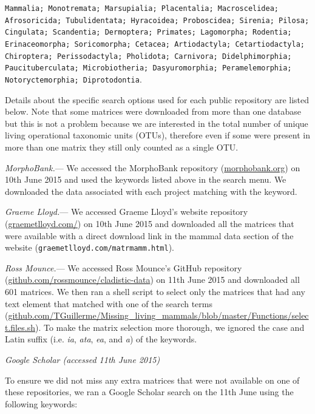 \documentclass[12pt,letterpaper]{article}
\renewcommand{\subsection}[1]{%
\bigskip
\begin{center}
\begin{large}
\normalfont\itshape #1
\end{large}
\end{center}}
\renewcommand{\subsubsection}[1]{%
\vspace{2ex}
\noindent
\textit{#1.}---}
\begin{document}
\texttt{Mammalia; Monotremata; Marsupialia; Placentalia; Macroscelidea; Afrosoricida; Tubulidentata; Hyracoidea; Proboscidea; Sirenia; Pilosa; Cingulata; Scandentia; Dermoptera; Primates; Lagomorpha; Rodentia; Erinaceomorpha; Soricomorpha; Cetacea; Artiodactyla; Cetartiodactyla; Chiroptera; Perissodactyla; Pholidota; Carnivora; Didelphimorphia; Paucituberculata; Microbiotheria; Dasyuromorphia; Peramelemorphia; Notoryctemorphia; Diprotodontia}.

Details about the specific search options used for each public repository are listed below.
Note that some matrices were downloaded from more than one database but this is not a problem because we are interested in the total number of unique living operational taxonomic units (OTUs), therefore even if some were present in more than one matrix they still only counted as a single OTU.

\subsubsection{MorphoBank}
We accessed the MorphoBank repository (\url{morphobank.org}) on 10th June 2015 and used the keywords listed above in the search menu.
We downloaded the data associated with each project matching with the keyword.

\subsubsection{Graeme Lloyd}
We accessed Graeme Lloyd's website repository (\url{graemetlloyd.com/}) on 10th June 2015 and downloaded all the matrices that were available with a direct download link in the mammal data section of the website (\texttt{graemetlloyd.com/matrmamm.html}).

\subsubsection{Ross Mounce}
We accessed Ross Mounce's GitHub repository (\url{github.com/rossmounce/cladistic-data}) on 11th June 2015 and downloaded all 601 matrices.
We then ran a shell script to select only the matrices that had any text element that matched with one of the search terms (\url{github.com/TGuillerme/Missing_living_mammals/blob/master/Functions/select.files.sh}).
To make the matrix selection more thorough, we ignored the case and Latin suffix (i.e. \textit{ia}, \textit{ata}, \textit{ea}, and \textit{a}) of the keywords.

\subsection{Google Scholar (accessed 11th June 2015)}
To ensure we did not miss any extra matrices that were not available on one of these repositories, we ran a Google Scholar search on the 11th June using the following keywords:
\end{document}
